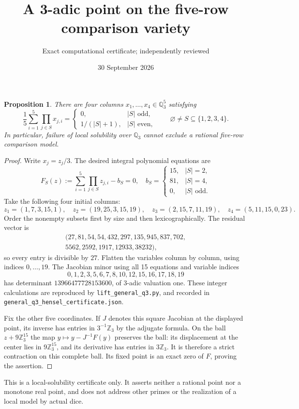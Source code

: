 \documentclass[11pt]{article}
\title{A 3-adic point on the five-row comparison variety}
\author{Exact computational certificate; independently reviewed}
\date{30 September 2026}
\newtheorem{proposition}{Proposition}
\begin{document}
\maketitle
\begin{proposition}
There are four columns $x_1,\ldots,x_4\in\mathbb Q_3^5$ satisfying
\[
 \frac15\sum_{i=1}^5\prod_{j\in S}x_{j,i}
 =\begin{cases}0,&|S|\text{ odd},\\1/(|S|+1),&|S|\text{ even},\end{cases}
 \qquad \varnothing\ne S\subseteq\{1,2,3,4\}.
\]
In particular, failure of local solubility over $\mathbb Q_3$ cannot
exclude a rational five-row comparison model.
\end{proposition}
\begin{proof}
Write $x_j=z_j/3$. The desired integral polynomial equations are
\[
 F_S(z):=\sum_{i=1}^5\prod_{j\in S}z_{j,i}-b_S=0,
 \quad b_S=\begin{cases}15,&|S|=2,\\81,&|S|=4,\\0,&|S|\text{ odd}.\end{cases}
\]
Take the following four initial columns:
\[
 z_1=(1,7,3,15,1),\quad z_2=(19,25,3,15,19),
 \quad z_3=(2,15,7,11,19),\quad z_4=(5,11,15,0,23).
\]
Order the nonempty subsets first by size and then lexicographically.
The residual vector is
\[
\begin{split}
(27,81,54,54,432,297,135,945,837,702,\\
5562,2592,1917,12933,38232),
\end{split}
\]
so every entry is divisible by $27$. Flatten the variables column by
column, using indices $0,\ldots,19$. The Jacobian minor using all
15 equations and variable indices
\[
0,1,2,3,5,6,7,8,10,12,15,16,17,18,19
\]
has determinant $13966477728153600$, of 3-adic valuation one.
These integer calculations are reproduced by
\texttt{lift\_general\_q3.py}, and recorded in
\texttt{general\_q3\_hensel\_certificate.json}.

Fix the other five coordinates. If $J$ denotes this square Jacobian
at the displayed point, its inverse has entries in $3^{-1}\mathbb Z_3$
by the adjugate formula. On the ball $z+9\mathbb Z_3^{15}$ the map
$y\mapsto y-J^{-1}F(y)$ preserves the ball: its displacement at the
center lies in $9\mathbb Z_3^{15}$, and its derivative has entries in
$3\mathbb Z_3$. It is therefore a strict contraction on this complete
ball. Its fixed point is an exact zero of $F$, proving the assertion.
\end{proof}
This is a local-solubility certificate only. It asserts neither a
rational point nor a monotone real point, and does not address other
primes or the realization of a local model by actual dice.
\end{document}
